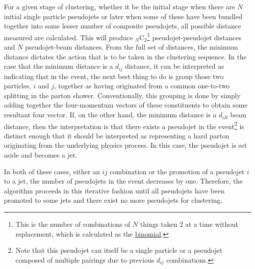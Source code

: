 \documentclass[UKenglish,texlive=2016]{\ATLASLATEXPATH atlasdoc}
\begin{document}
For a given stage of clustering, whether it be the initial stage when there are $N$ initial single particle pseudojets or later when some of these have been bundled together into some lesser number of composite pseudojets, all possible distance measured are calculated.  This will produce $_N$C$_2$\footnote{This is the number of combinations of $N$ things taken $2$ at a time without replacement, which is calculated as the \href{https://en.wikipedia.org/wiki/Combination}{binomial}.} pseudojet-pseudojet distances and $N$ pseudojet-beam distances.  From the full set of distances, the minimum distance dictates the action that is to be taken in the clustering sequence.  In the case that the minimum distance is a $d_{ij}$ distance, it can be interpreted as indicating that in the event, the next best thing to do is group those two particles, $i$ and $j$, together as having originated from a common one-to-two splitting in the parton shower.  Conventionally, this grouping is done by simply adding together the four-momentum vectors of these constituents to obtain some resultant four vector.  If, on the other hand, the minimum distance is a $d_{iB}$ beam distance, then the interpretation is that there exists a pseudojet in the event\footnote{Note that this pseudojet can itself be a single particle or a pseudojet composed of multiple pairings due to previous $d_{ij}$ combinations.} is distinct enough that it should be interpreted as representing a hard parton originating from the underlying physics process.  In this case, the pseudojet is set aside and becomes a jet.

In both of these cases, either an $ij$ combination or the promotion of a pseudojet $i$ to a jet, the number of pseudojets in the event decreases by one.  Therefore, the algorithm proceeds in this iterative fashion until all pseudojets have been promoted to some jets and there exist no more pseudojets for clustering.

\begin{center}
\end{center}
\end{document}

